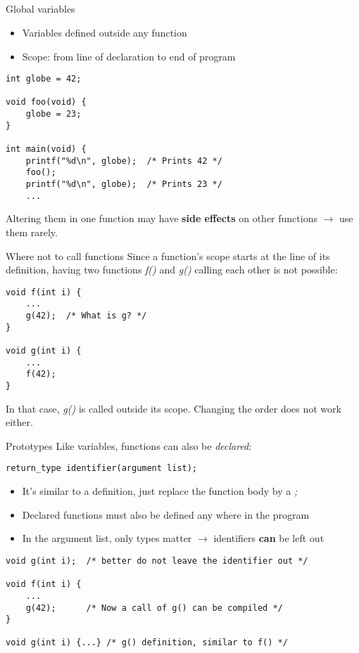 \subsection{}
\begin{frame}[fragile]{Global variables}
	\begin{itemize}
		\item Variables defined outside any function
		\item Scope: from line of declaration to end of program
	\end{itemize}
	\begin{lstlisting}
int globe = 42;

void foo(void) {
	globe = 23;
}

int main(void) {
	printf("%d\n", globe);	/* Prints 42 */
	foo();
	printf("%d\n", globe);	/* Prints 23 */
	...
\end{lstlisting}
	Altering them in one function may have \textbf{side effects} on other functions $\rightarrow$ use them rarely.
\end{frame}
\begin{frame}[fragile]{Where not to call functions}
	Since a function's scope starts at the line of its definition, having two functions \textit{f()} and \textit{g()} calling each other is not possible:
	\begin{lstlisting}
void f(int i) {
	...
	g(42);	/* What is g? */
}

void g(int i) {
	...
	f(42);
}
\end{lstlisting}
	In that case, \textit{g()} is called outside its scope. Changing the order does not work either.
\end{frame}
\begin{frame}[fragile]{Prototypes}
	Like variables, functions can also be \textit{declared}:
	\begin{lstlisting}[numbers=none,basicstyle=\itshape\footnotesize]
return_type identifier(argument list);
\end{lstlisting}
	\begin{itemize}
		\item It's similar to a definition, just replace the function body by a \textit{;}
		\item Declared functions must also be defined any where in the program
		\item In the argument list, only types matter $\rightarrow$ identifiers \textbf{can} be left out
	\end{itemize}
	\begin{lstlisting}
void g(int i);	/* better do not leave the identifier out */

void f(int i) {
	...
	g(42);		/* Now a call of g() can be compiled */
}

void g(int i) {...}	/* g() definition, similar to f() */
\end{lstlisting}
\end{frame}
